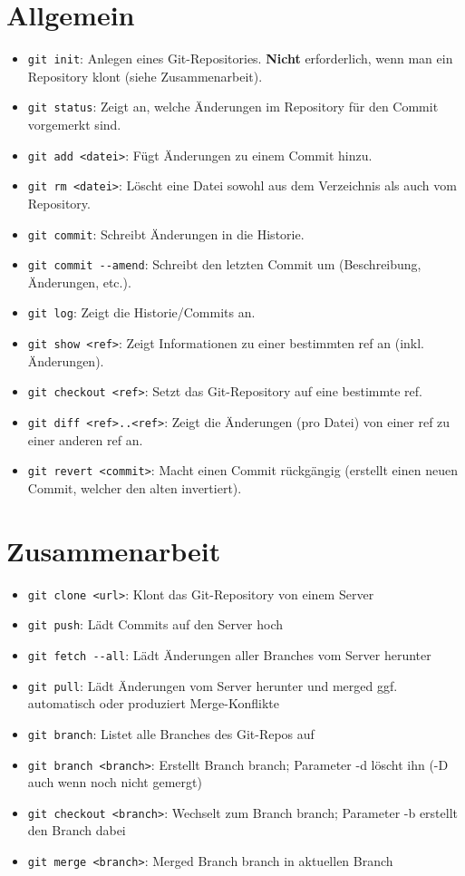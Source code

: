 \documentclass[accentcolor=TUDa-8b,colorbacktitle,12pt]{tudaexercise}
\begin{document}
\section*{Allgemein}
\begin{itemize}
	\item \lstinline|git init|: Anlegen eines Git-Repositories. \textbf{Nicht} erforderlich, wenn man ein Repository klont (siehe Zusammenarbeit).
	\item \lstinline|git status|: Zeigt an, welche Änderungen im Repository für den Commit vorgemerkt sind.
	\item \lstinline|git add <datei>|: Fügt Änderungen zu einem Commit hinzu.
	\item \lstinline|git rm <datei>|: Löscht eine Datei sowohl aus dem Verzeichnis als auch vom Repository.
	\item \lstinline|git commit|: Schreibt Änderungen in die Historie.
	\item \lstinline|git commit --amend|: Schreibt den letzten Commit um (Beschreibung, Änderungen, etc.).
	\item \lstinline|git log|: Zeigt die Historie/Commits an.
	\item \lstinline|git show <ref>|: Zeigt Informationen zu einer bestimmten ref an (inkl. Änderungen).
	\item \lstinline|git checkout <ref>|: Setzt das Git-Repository auf eine bestimmte ref.
	\item \lstinline|git diff <ref>..<ref>|: Zeigt die Änderungen (pro Datei) von einer ref zu einer anderen ref an.
	\item \lstinline|git revert <commit>|: Macht einen Commit rückgängig (erstellt einen neuen Commit, welcher den alten invertiert).
\end{itemize}

\section*{Zusammenarbeit}
\begin{itemize}
	\label{CollabClone}
	\item \lstinline|git clone <url>|: Klont das Git-Repository von einem Server
	\item \lstinline|git push|: Lädt Commits auf den Server hoch
	\item \lstinline|git fetch --all|: Lädt Änderungen aller Branches vom Server herunter
	\item \lstinline|git pull|: Lädt Änderungen vom Server herunter und merged ggf. automatisch oder produziert Merge-Konflikte
	\item \lstinline|git branch|: Listet alle Branches des Git-Repos auf
	\item \lstinline|git branch <branch>|: Erstellt Branch branch; Parameter -d löscht ihn (-D auch wenn noch nicht gemergt)
	\item \lstinline|git checkout <branch>|: Wechselt zum Branch branch; Parameter -b erstellt den Branch dabei
	\item \lstinline|git merge <branch>|: Merged Branch branch in aktuellen Branch
\end{itemize}
\end{document}
